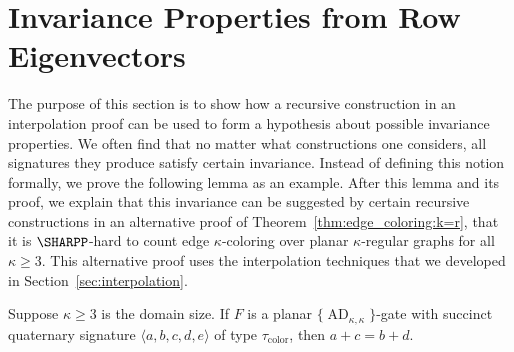 \documentclass[11pt]{article}
\newcommand{\AD}{\operatorname{AD}}
\begin{document}
\section{Invariance Properties from Row Eigenvectors} \label{sec:appendix:invariant}

The purpose of this section is to show how a recursive construction in an interpolation proof
can be used to form a hypothesis about possible invariance properties.
We often find that no matter what constructions one considers,
all signatures they produce satisfy certain invariance.
Instead of defining this notion formally,
we prove the following lemma as an example.
After this lemma and its proof,
we explain that this invariance can be suggested by certain recursive constructions in an alternative proof of Theorem~\ref{thm:edge_coloring:k=r},
that it is $\SHARPP$-hard to count edge $\kappa$-coloring over planar $\kappa$-regular graphs for all $\kappa \ge 3$.
This alternative proof uses the interpolation techniques that we developed in Section~\ref{sec:interpolation}.

\begin{lemma} \label{lem:k=r:invariant}
 Suppose $\kappa \ge 3$ is the domain size.
 If $F$ is a planar $\{\AD_{\kappa,\kappa}\}$-gate with succinct quaternary signature $\langle a,b,c,d,e \rangle$ of type $\tau_\text{color}$,
 then $a + c = b + d$.
\end{lemma}
\end{document}
